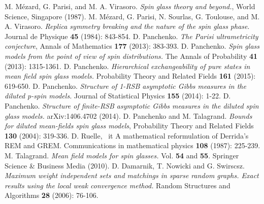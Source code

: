 \documentclass[a4paper,12pt,oneside,reqno]{amsart}
\numberwithin{equation}{section}
\begin{document}
\begin{thebibliography}{1}
 M. M\'{e}zard, G. Parisi, and M. A. Virasoro. {\it Spin glass theory and beyond.},  World Science, Singapore (1987).
 M. M\'{e}zard, G. Parisi, N. Sourlas, G. Toulouse, and M. A. Virasoro. {\it Replica symmetry breaking and the nature of the spin glass phase}. Journal de Physique {\bf 45} (1984): 843-854.
 D. Panchenko. {\it The Parisi ultrametricity conjecture}, Annals of Mathematics {\bf 177} (2013): 383-393.
 D. Panchenko. {\it Spin glass models from the point of view of spin distributions.} 
The Annals of Probability {\bf 41} (2013): 1315-1361.
 D. Panchenko. {\it Hierarchical exchangeability of pure states in mean field spin glass models.} Probability Theory and Related Fields {\bf 161}  (2015): 619-650.
 D. Panchenko. {\it Structure of 1-RSB asymptotic Gibbs measures in the diluted p-spin models.} Journal of Statistical Physics {\bf 155} (2014): 1-22.
 D. Panchenko. {\it Structure of finite-RSB asymptotic Gibbs measures in the diluted spin glass models.} arXiv:1406.4702 (2014).
 D. Panchenko and M. Talagrand. {\it Bounds for diluted mean-fields spin glass models}, Probability Theory and Related Fields {\bf 130} (2004): 319-336.
 D. Ruelle, {\ it A mathematical reformulation of Derrida's REM and GREM}. Communications in mathematical physics {\bf 108} (1987): 225-239.
 M. Talagrand. {\it Mean field models for spin glasses.} Vol. {\bf 54} and {\bf 55}. Springer Science \& Business Media (2010).
 D. Damarnik, T. Nowicki and G. Swirscsz. {\it Maximum weight independent sets and matchings in sparse random graphs. Exact results using the local weak convergence method.} Random Structures and Algorithms {\bf 28} (2006): 76-106.
\end{thebibliography} 
\end{document}
